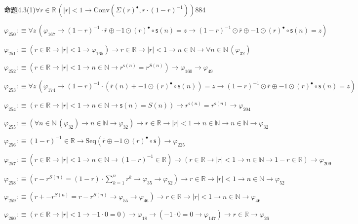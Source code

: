 \begin{fullproof}{命題4.3(1)}{$\forall r \in \mathbb{R}\,(\lvert r \rvert < 1 \to \mathrm{Conv}(\Sigma {(r)^{\bullet}},r \cdot (1 - r)^{-1}))$}{884}
\begin{abbrevlist}
\item $\varphi_{250} :\equiv \forall z\,(\varphi_{167} \to (1 - r)^{-1} \cdot \overline{r} \oplus -1 \odot {(r)^{\bullet}} \circ \mathsf{s}(n) = z \to (1 - r)^{-1} \odot \overline{r} \oplus -1 \odot {(r)^{\bullet}} \circ \mathsf{s}(n) = z)$
\item $\varphi_{251} :\equiv (r \in \mathbb{R} \to \lvert r \rvert < 1 \to \varphi_{165}) \to r \in \mathbb{R} \to \lvert r \rvert < 1 \to n \in \mathbb{N} \to \forall n \in \mathbb{N}\,(\varphi_{32})$
\item $\varphi_{252} :\equiv (r \in \mathbb{R} \to \lvert r \rvert < 1 \to n \in \mathbb{N} \to {{r}^{\mathsf{s}(n)}} = {{r}^{S(n)}}) \to \varphi_{160} \to \varphi_{49}$
\item $\varphi_{253} :\equiv \forall z\,(\varphi_{174} \to (1 - r)^{-1} \cdot (\overline{r}(n) + -1 \odot {(r)^{\bullet}} \circ \mathsf{s}(n)) = z \to (1 - r)^{-1} \odot \overline{r} \oplus -1 \odot {(r)^{\bullet}} \circ \mathsf{s}(n) = z)$
\item $\varphi_{254} :\equiv (r \in \mathbb{R} \to \lvert r \rvert < 1 \to n \in \mathbb{N} \to \mathsf{s}(n) = S(n)) \to {{r}^{\mathsf{s}(n)}} = {{r}^{\mathsf{s}(n)}} \to \varphi_{204}$
\item $\varphi_{255} :\equiv (\forall n \in \mathbb{N}\,(\varphi_{32}) \to n \in \mathbb{N} \to \varphi_{32}) \to r \in \mathbb{R} \to \lvert r \rvert < 1 \to n \in \mathbb{N} \to n \in \mathbb{N} \to \varphi_{32}$
\item $\varphi_{256} :\equiv (1 - r)^{-1} \in \mathbb{R} \to \mathrm{Seq}(\overline{r} \oplus -1 \odot {(r)^{\bullet}} \circ \mathsf{s}) \to \varphi_{225}$
\item $\varphi_{257} :\equiv (r \in \mathbb{R} \to \lvert r \rvert < 1 \to n \in \mathbb{N} \to (1 - r)^{-1} \in \mathbb{R}) \to (r \in \mathbb{R} \to \lvert r \rvert < 1 \to n \in \mathbb{N} \to 1 - r \in \mathbb{R}) \to \varphi_{209}$
\item $\varphi_{258} :\equiv (r - {{r}^{S(n)}} = (1 - r) \cdot {\textstyle\sum_{k=1}^{n} {{r}^{k}}} \to \varphi_{35} \to \varphi_{52}) \to r \in \mathbb{R} \to \lvert r \rvert < 1 \to n \in \mathbb{N} \to \varphi_{52}$
\item $\varphi_{259} :\equiv (r + -{{r}^{S(n)}} = r - {{r}^{S(n)}} \to \varphi_{55} \to \varphi_{46}) \to r \in \mathbb{R} \to \lvert r \rvert < 1 \to n \in \mathbb{N} \to \varphi_{46}$
\item $\varphi_{260} :\equiv (r \in \mathbb{R} \to \lvert r \rvert < 1 \to -1 \cdot 0 = 0) \to \varphi_{18} \to (-1 \cdot 0 = 0 \to \varphi_{147}) \to r \in \mathbb{R} \to \varphi_{26}$

\end{abbrevlist}
\end{fullproof}
